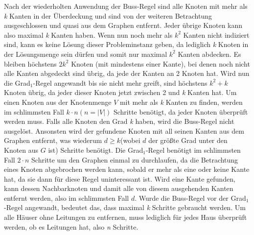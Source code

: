 Nach der wiederholten Anwendung der Buss-Regel sind alle Knoten mit mehr als \emph{k} Kanten in der Überdeckung und sind von der weiteren Betrachtung ausgeschlossen und quasi aus dem Graphen entfernt. Jeder übrige Knoten kann also maximal \emph{k} Kanten haben. Wenn nun noch mehr als $k^{2}$ Kanten nicht indiziert sind, kann es keine Lösung dieser Probleminstanz geben, da lediglich \emph{k} Knoten in der Lösungsmenge sein dürfen und somit nur maximal $k^{2}$ Kanten  abdecken. Es bleiben höchstens $2 k^{2}$ Knoten (mit mindestens einer Kante), bei denen noch nicht alle Kanten abgedeckt sind übrig\cite{param}, da jede der Kanten an 2 Knoten hat. Wird nun die Grad$_{1}$-Regel angewandt bis sie nicht mehr greift, sind höchstens $k^{2} + k$ Knoten übrig, da jeder dieser Knoten jetzt zwischen 2 und \emph{k} Kanten hat.
Um einen Knoten aus der Knotenmenge $V$ mit mehr als \emph{k} Kanten zu finden, werden im schlimmsten Fall $k \cdot n (n=|V|)$ Schritte benötigt, da jeder Knoten überprüft werden muss. Falls alle Knoten den Grad \emph{k} haben, wird die Buss-Regel nicht ausgelöst. Ansonsten wird der gefundene Knoten mit all seinen Kanten aus dem Graphen entfernt, was wiederum $d \geq k$(wobei $d$ der größte Grad unter den Knoten aus $G$ ist) Schritte benötigt. Die Grad$_{1}$-Regel benötigt im schlimmsten Fall $2 \cdot n$ Schritte um den Graphen einmal zu durchlaufen, da die Betrachtung eines Knoten abgebrochen werden kann, sobald er mehr als eine oder keine Kante hat, da sie dann für diese Regel uninteressant ist. Wird eine Kante gefunden, kann dessen Nachbarknoten und damit alle von diesem ausgehenden Kanten entfernt werden, also im schlimmsten Fall $d$. Wurde die Buss-Regel vor der Grad$_{1}$-Regel angewandt, bedeutet das, dass maximal \emph{k} Schritte gebraucht werden. Um alle Häuser ohne Leitungen zu entfernen, muss lediglich für jedes Haus überprüft werden, ob es Leitungen hat, also \emph{n} Schritte.


